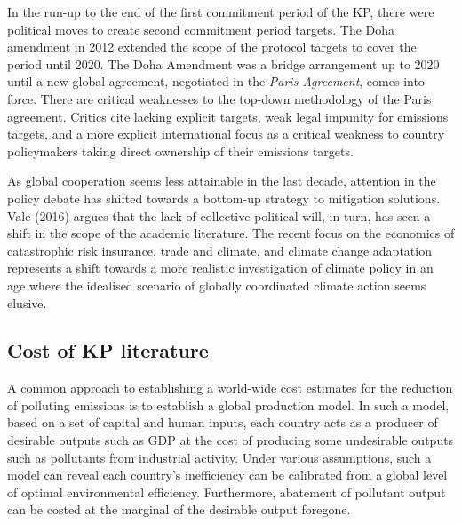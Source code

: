 \documentclass[
  10pt,
]{article}
\begin{document}
In the run-up to the end of the first commitment period of the KP, there
were political moves to create second commitment period targets. The
Doha amendment in 2012 extended the scope of the protocol targets to
cover the period until 2020. The Doha Amendment was a bridge arrangement
up to 2020 until a new global agreement, negotiated in the \emph{Paris
Agreement}, comes into force. There are critical weaknesses to the
top-down methodology of the Paris agreement. Critics cite lacking
explicit targets, weak legal impunity for emissions targets, and a more
explicit international focus as a critical weakness to country
policymakers taking direct ownership of their emissions targets.

As global cooperation seems less attainable in the last decade,
attention in the policy debate has shifted towards a bottom-up strategy
to mitigation solutions. Vale (2016) argues that the lack of collective
political will, in turn, has seen a shift in the scope of the academic
literature. The recent focus on the economics of catastrophic risk
insurance, trade and climate, and climate change adaptation represents a
shift towards a more realistic investigation of climate policy in an age
where the idealised scenario of globally coordinated climate action seems
elusive.

\hypertarget{cost-of-kp-literature}{%
\subsection{Cost of KP literature}\label{cost-of-kp-literature}}

A common approach to establishing a world-wide cost estimates for the reduction of polluting emissions is to establish a global production model.  In such a model, based on a set of capital and human inputs,  each country acts as a producer of desirable outputs such as GDP at the cost of producing some undesirable outputs such as pollutants from industrial activity. Under various assumptions, such a model can reveal each country's inefficiency can be calibrated from a global level of optimal environmental efficiency.  Furthermore, abatement of pollutant output can be costed at the marginal of the desirable output foregone.
\end{document}
